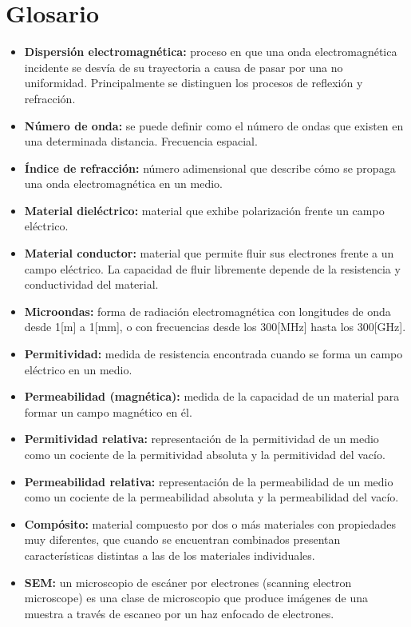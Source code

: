 \documentclass[12pt,letterpaper]{article}
\numberwithin{equation}{section}
\begin{document}
\section*{Glosario}
\begin{itemize}
	\renewcommand\labelitemi{--}
	\item \textbf{Dispersión electromagnética:} proceso en que una onda electromagnética incidente se desvía de su trayectoria a causa de pasar por una no uniformidad. Principalmente se distinguen los procesos de reflexión y refracción. 
	\item \textbf{Número de onda:} se puede definir como el número de ondas que existen en una determinada distancia. Frecuencia espacial.
	\item \textbf{Índice de refracción:} número adimensional que describe cómo se propaga una onda electromagnética en un medio.
	\item \textbf{Material dieléctrico:} material que exhibe polarización frente un campo eléctrico. 
	\item \textbf{Material conductor:} material que permite fluir sus electrones frente a un campo eléctrico. La capacidad de fluir libremente depende de la resistencia y conductividad del material.
	\item \textbf{Microondas:} forma de radiación electromagnética con longitudes de onda desde 1[m] a 1[mm], o con frecuencias desde los 300[MHz] hasta los 300[GHz].
	\item \textbf{Permitividad:} medida de resistencia encontrada cuando se forma un campo eléctrico en un medio.
	\item \textbf{Permeabilidad (magnética):} medida de la capacidad de un material para formar un campo magnético en él.
	\item \textbf{Permitividad relativa:} representación de la permitividad de un medio como un cociente de la permitividad absoluta y la permitividad del vacío. 
	\item \textbf{Permeabilidad relativa:} representación de la permeabilidad de un medio como un cociente de la permeabilidad absoluta y la permeabilidad del vacío. 
	\item \textbf{Compósito:} material compuesto por dos o más materiales con propiedades muy diferentes, que cuando se encuentran combinados presentan características distintas a las de los materiales individuales.  
	\item \textbf{SEM:} un microscopio de escáner por electrones (scanning electron microscope) es una clase de microscopio que produce imágenes de una muestra a través de escaneo por un haz enfocado de electrones.

\end{itemize}
\end{document}
